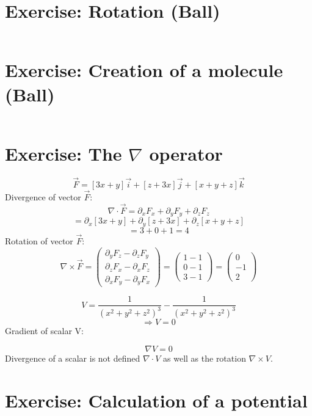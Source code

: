 \documentclass[11pt]{article}
\begin{document}
\date{\today}

\section{Exercise: Rotation (Ball)}

\begin{lstlisting}
\end{lstlisting}

\section{Exercise: Creation of a molecule (Ball)}

\begin{lstlisting}
\end{lstlisting}

\section{Exercise: The $\nabla$ operator}

\[ \vec{F} = [3x + y]\vec{i} + [z + 3x]\vec{j} + [x + y + z]\vec{k} \]
Divergence of vector $\vec{F}$:
\[ \nabla \cdot \vec{F} = \partial_x F_x + \partial_y F_y + \partial_z F_z \]
\[ =  \partial_x [3x + y] + \partial_y  [z + 3x] + \partial_z [x + y + z] \]
\[ = 3 + 0 + 1 = 4 \]
Rotation of vector $\vec{F}$:
\[ \nabla \times \vec{F} = \begin{pmatrix}
\partial_y F_z - \partial_z F_y \\
\partial_z F_x - \partial_x F_z \\
\partial_x F_y - \partial_y F_x
\end{pmatrix}  = \begin{pmatrix}
1 - 1 \\
0 - 1 \\
3 - 1
\end{pmatrix} = \begin{pmatrix}
0 \\
-1 \\
2
\end{pmatrix}\]



\[ V = \frac{1}{(x^2 + y^2 + z^2)^3} - \frac{1}{(x^2 + y^2 + z^2)^3}\]
\[ \Rightarrow V = 0 \]
Gradient of scalar V:

\[ \nabla V = 0 \]
Divergence of a scalar is not defined $\nabla \cdot V$ as well as the rotation $\nabla \times V$.

\section{Exercise: Calculation of a potential}
\end{document}
